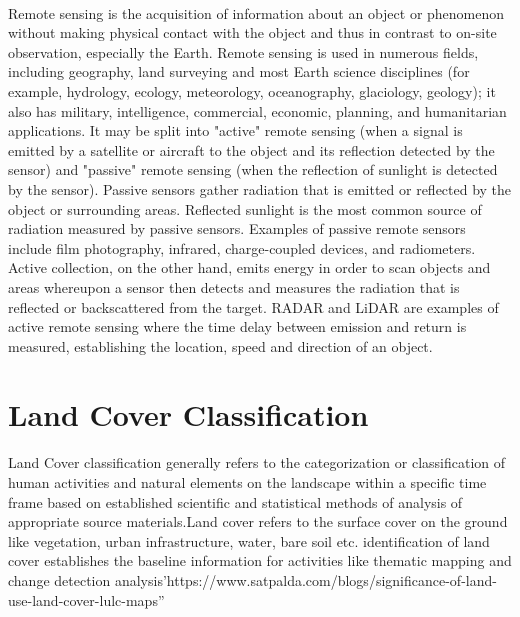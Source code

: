 \documentclass[12pt, a4paper]{report}
\begin{document}
\paragraph{}
Remote sensing is the acquisition of information about an object or phenomenon without making physical contact with the object and thus in contrast to on-site observation, especially the Earth. Remote sensing is used in numerous fields, including geography, land surveying and most Earth science disciplines (for example, hydrology, ecology, meteorology, oceanography, glaciology, geology); it also has military, intelligence, commercial, economic, planning, and humanitarian applications.  It may be split into "active" remote sensing (when a signal is emitted by a satellite or aircraft to the object and its reflection detected by the sensor) and "passive" remote sensing (when the reflection of sunlight is detected by the sensor). Passive sensors gather radiation that is emitted or reflected by the object or surrounding areas. Reflected sunlight is the most common source of radiation measured by passive sensors. Examples of passive remote sensors include film photography, infrared, charge-coupled devices, and radiometers. Active collection, on the other hand, emits energy in order to scan objects and areas whereupon a sensor then detects and measures the radiation that is reflected or backscattered from the target. RADAR and LiDAR are examples of active remote sensing where the time delay between emission and return is measured, establishing the location, speed and direction of an object. \cite{remotesensingwiki}
\section{Land Cover Classification}
Land Cover classification generally refers to the categorization or classification of human activities and natural elements on the landscape within a specific time frame based on established scientific and statistical methods of analysis of appropriate source materials.Land cover refers to the surface cover on the ground like vegetation, urban infrastructure, water, bare soil etc. identification of land cover establishes the baseline information for activities like thematic mapping and change detection analysis'https://www.satpalda.com/blogs/significance-of-land-use-land-cover-lulc-maps''\\
\end{document}
